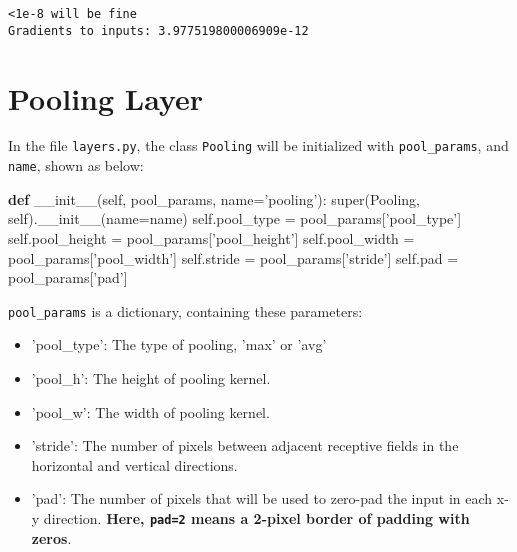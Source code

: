 \documentclass[11pt]{article}
\providecommand{\tightlist}{%
      \setlength{\itemsep}{0pt}\setlength{\parskip}{0pt}}
\newenvironment{Shaded}{}{}
\newcommand{\KeywordTok}[1]{\textcolor[rgb]{0.00,0.44,0.13}{\textbf{{#1}}}}
\newcommand{\StringTok}[1]{\textcolor[rgb]{0.25,0.44,0.63}{{#1}}}
\newcommand{\FunctionTok}[1]{\textcolor[rgb]{0.02,0.16,0.49}{{#1}}}
\newcommand{\NormalTok}[1]{{#1}}
\newcommand{\VariableTok}[1]{\textcolor[rgb]{0.10,0.09,0.49}{{#1}}}
\newcommand{\OperatorTok}[1]{\textcolor[rgb]{0.40,0.40,0.40}{{#1}}}
\newcommand{\BuiltInTok}[1]{{#1}}
\begin{document}
    \begin{Verbatim}[commandchars=\\\{\}]
<1e-8 will be fine
Gradients to inputs: 3.977519800006909e-12

    \end{Verbatim}

    \section{Pooling Layer}\label{pooling-layer}

In the file \texttt{layers.py}, the class \texttt{Pooling} will be
initialized with \texttt{pool\_params}, and \texttt{name}, shown as
below:

\begin{Shaded}
\begin{Highlighting}[]
\KeywordTok{def} \FunctionTok{__init__}\NormalTok{(}\VariableTok{self}\NormalTok{, pool_params, name}\OperatorTok{=}\StringTok{'pooling'}\NormalTok{):}
        \BuiltInTok{super}\NormalTok{(Pooling, }\VariableTok{self}\NormalTok{).}\FunctionTok{__init__}\NormalTok{(name}\OperatorTok{=}\NormalTok{name)}
        \VariableTok{self}\NormalTok{.pool_type }\OperatorTok{=}\NormalTok{ pool_params[}\StringTok{'pool_type'}\NormalTok{]}
        \VariableTok{self}\NormalTok{.pool_height }\OperatorTok{=}\NormalTok{ pool_params[}\StringTok{'pool_height'}\NormalTok{]}
        \VariableTok{self}\NormalTok{.pool_width }\OperatorTok{=}\NormalTok{ pool_params[}\StringTok{'pool_width'}\NormalTok{]}
        \VariableTok{self}\NormalTok{.stride }\OperatorTok{=}\NormalTok{ pool_params[}\StringTok{'stride'}\NormalTok{]}
        \VariableTok{self}\NormalTok{.pad }\OperatorTok{=}\NormalTok{ pool_params[}\StringTok{'pad'}\NormalTok{]}
\end{Highlighting}
\end{Shaded}

\texttt{pool\_params} is a dictionary, containing these parameters:

\begin{itemize}
\tightlist
\item
  'pool\_type': The type of pooling, 'max' or 'avg'
\item
  'pool\_h': The height of pooling kernel.
\item
  'pool\_w': The width of pooling kernel.
\item
  'stride': The number of pixels between adjacent receptive fields in
  the horizontal and vertical directions.
\item
  'pad': The number of pixels that will be used to zero-pad the input in
  each x-y direction. \textbf{Here, \texttt{pad=2} means a 2-pixel
  border of padding with zeros}.
\end{itemize}
\end{document}
